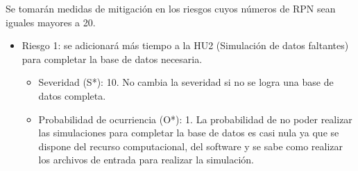 \documentclass[
11pt, %
]{charter}
\begin{document}
Se tomarán medidas de mitigación en los riesgos cuyos números de RPN sean iguales   mayores a 20.
\begin{itemize}
    \item Riesgo 1: se adicionará más tiempo a la HU2 (Simulación de datos faltantes) para completar la base de datos necesaria.
    \begin{itemize}
        \item Severidad (S*): 10. No cambia la severidad si no se logra una base de datos completa.
        \item Probabilidad de ocurriencia (O*): 1. La probabilidad de no poder realizar las simulaciones para completar la base de datos es casi nula ya que se dispone del recurso computacional, del software y se sabe como realizar los archivos de entrada para realizar la simulación.
    \end{itemize}
\end{itemize}
\end{document}
